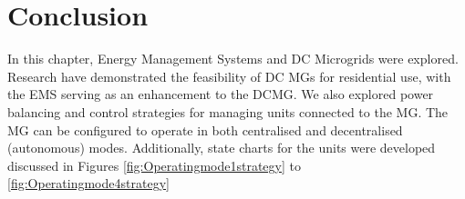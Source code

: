 \section{Conclusion}
In this chapter, Energy Management Systems and DC Microgrids were explored. Research have demonstrated the feasibility of DC MGs for residential use, with the EMS serving as an enhancement to the DCMG. We also explored power balancing and control strategies for managing units connected to the MG. The MG can be configured to operate in both centralised and decentralised (autonomous) modes. Additionally, state charts for the units were developed discussed in Figures \ref{fig:Operatingmode1strategy} to \ref{fig:Operatingmode4strategy}

